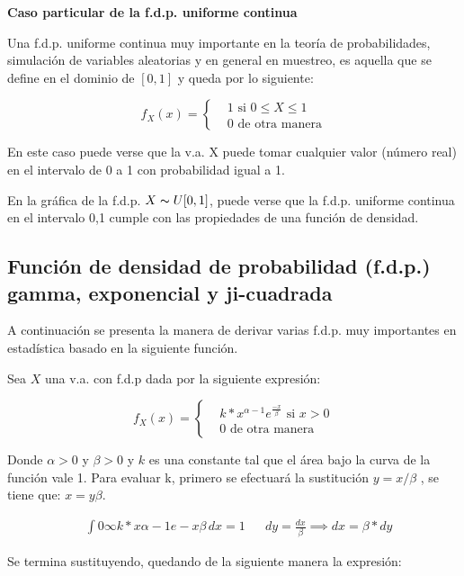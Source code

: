 \textbf{Caso particular de la f.d.p. uniforme continua}

Una f.d.p. uniforme continua muy importante en la teoría de
probabilidades, simulación de variables aleatorias y en general
en muestreo, es aquella que se define en el dominio de $[0,1]$ y
queda por lo siguiente:

\begin{equation}
    f_X( x )=\begin{cases}
         & 1\text{ si }0\leq X\leq 1 \\
         & 0 \text{ de otra manera}\end{cases}
\end{equation}

En este caso puede verse que la v.a. X puede tomar cualquier
valor (número real) en el intervalo de 0 a 1 con probabilidad
igual a 1.

En la gráfica de la f.d.p. $X\thicksim U[0,1]$, puede verse que la f.d.p. uniforme continua en el intervalo 0,1 cumple con las propiedades de una función de densidad.

\subsection{Función de densidad de probabilidad (f.d.p.) gamma, exponencial y ji-cuadrada}

A continuación se presenta la manera de derivar varias f.d.p.
muy importantes en estadística basado en la siguiente
función.

Sea $X$ una v.a. con f.d.p dada por la siguiente expresión:

\begin{equation}
    f_X( x )=\begin{cases}
         & k*x^{\alpha-1}e^{\frac{-x}{\beta}}\text{ si }x>0 \\
         & 0 \text{ de otra manera}\end{cases}
\end{equation}

Donde $\alpha >0$ y $\beta >0$ y $k$ es una constante tal que el área bajo la curva de la función vale 1. Para evaluar k, primero se efectuará la sustitución $y=x/\beta$ , se tiene que: $x = y\beta$.

\begin{align*}
     & \int 0\infty k*x\alpha -1e-x\beta \, dx =1 &  & dy=\frac{dx}{\beta}\implies dx=\beta *dy
\end{align*}

Se termina sustituyendo, quedando de la siguiente manera la expresión:

